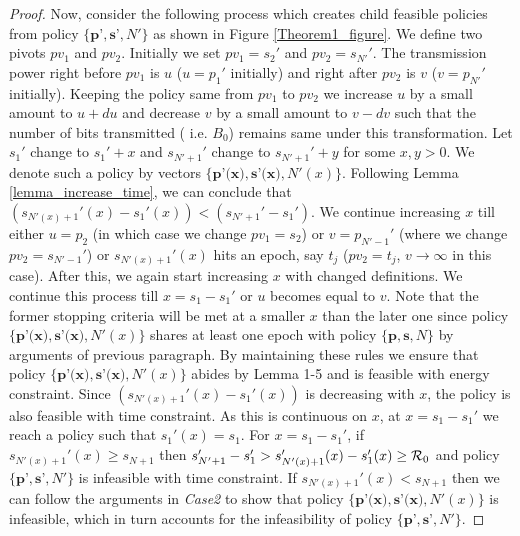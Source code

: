 \begin{proof}
Now, consider the following process which creates child feasible policies from policy $\{\textbf{p'},\textbf{s'},N'\}$ as shown in Figure \ref{Theorem1_figure}. We define two pivots $pv_1$ and $pv_2$. Initially we set $pv_1=s_2'$ and $pv_2=s_{N'}'$. The transmission power right before $pv_1$ is $u$ ($u=p_1'$ initially) and right after $pv_2$ is $v$ ($v=p_{N'}'$ initially). Keeping the policy same from $pv_1$ to $pv_2$ we increase $u$ by a small amount to $u+du$ and decrease $v$ by a small amount to $v-dv$ such that the number of bits transmitted ( i.e. $B_0$) remains same under this transformation. Let $s_1'$ change to $s_1'+x$ and $s_{N'+1}'$ change to $s_{N'+1}'+y$ for some $x,y>0$. We denote such a policy by vectors $\{\textbf{p'(x)},\textbf{s'(x)},N'(x)\}$. Following Lemma \ref{lemma_increase_time}, we can conclude that $(s_{N'(x)+1}'(x)-s_1'(x))<(s_{N'+1}'-s_1')$. We continue increasing $x$ till either $u=p_2$ (in which case we change $pv_1=s_2$) or $v=p_{N'-1}'$ (where we change $pv_2=s_{N'-1}'$) or $s_{N'(x)+1}'(x)$ hits an epoch, say $t_j$ ($pv_2=t_j$, $v\rightarrow\infty$ in this case). After this, we again start increasing $x$ with changed definitions. We continue this process till $x=s_1-s_1'$  or $u$ becomes equal to $v$. Note that the former stopping criteria will be met at a smaller $x$ than the later one since policy $\{\textbf{p'(x)},\textbf{s'(x)},N'(x)\}$ shares at least one epoch with policy $\{\textbf{p},\textbf{s},N\}$ by arguments of previous paragraph. By maintaining these rules we ensure that policy $\{\textbf{p'(x)},\textbf{s'(x)},N'(x)\}$ abides by Lemma 1-5 and is feasible with energy constraint. Since $\left( s_{N'(x)+1}'(x)-s_1'(x)\right)$ is decreasing with $x$, the policy is also feasible with time constraint. As this is continuous on $x$, at $x=s_1-s_1'$ we reach a policy such that $s_1'(x)=s_1$. For $x=s_1-s_1'$, if $s_{N'(x)+1}'(x)\ge s_{N+1}$ then $s_{N'+1}'-s_1'>s_{N'(x)+1}'(x)-s_1'(x)\ge \mathcal{R}_0$ and policy $\{\textbf{p'},\textbf{s'},N'\}$ is infeasible with time constraint. If $s_{N'(x)+1}'(x)< s_{N+1}$ then we can follow the arguments in \textit{Case2} to show that policy $\{\textbf{p'(x)},\textbf{s'(x)},N'(x)\}$ is infeasible, which in turn accounts for the infeasibility of policy $\{\textbf{p'},\textbf{s'},N'\}$.
\end{proof}


























